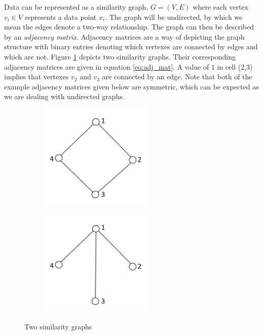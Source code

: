 Data can be represented as a similarity graph, $G = (V,E)$ where each vertex $v_i \in V$ represents a data point $x_i$. The graph will be undirected, by which we mean the edges denote a two-way relationship.  The graph can then be described by an \textit{adjacency matrix}. Adjacency matrices are a way of depicting the graph structure with binary entries denoting which vertexes are connected by edges and which are not. Figure \ref{fig:sim_graphs} depicts two similarity graphs. Their corresponding adjacency matrices are given in equation \eqref{eq:adj_mat}.  A  value of $1$ in cell (2,3) implies that vertexes $v_2$ and $v_3$ are connected by an edge. Note that both of the example adjacency matrices given below are symmetric, which can be expected as we are dealing with undirected graphs.

\begin{figure}[h!]
  \centering
  \begin{subfigure}{0.4\textwidth}
    \centering
    \includegraphics[width = 0.6\textwidth]{adj_square.png}
  \end{subfigure}
  \begin{subfigure}{0.4\textwidth}
    \centering
    \includegraphics[width = 0.6\textwidth]{adj_tree.png}
  \end{subfigure}
  \caption{Two similarity graphs}
  \label{fig:sim_graphs}
\end{figure}


